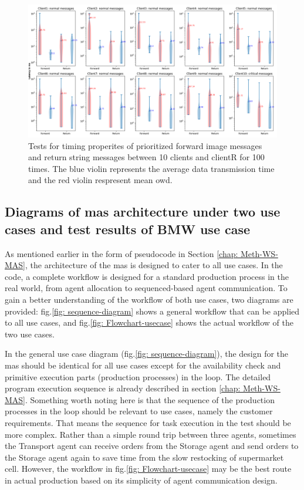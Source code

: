 \begin{figure}
    \centering
    \includegraphics[width=\textheight]{figures/tests/priority_tests/log_violin_10clients_image_priority.png}\hfill 
    \caption{Tests for timing properites of prioritized forward image messages and return string messages between 10 clients 
    and clientR for 100 times. The blue violin represents the average data transmission time and the red violin 
    respresent mean \gls{owd}.} \label{fig: priority-10clients-d}
\end{figure}


\subsection{Diagrams of \gls{mas} architecture under two use cases and 
test results of BMW use case}\label{chap: Result-Internal-Usecase}

As mentioned earlier in the form of pseudocode in Section \ref{chap: Meth-WS-MAS}, 
the architecture of the \gls{mas} is designed to cater to all use cases. In the code, 
a complete workflow is designed for a standard production process in the real world, 
from agent allocation to sequenced-based agent communication. To gain a better 
understanding of the workflow of both use cases, two diagrams are provided: 
fig.\ref{fig: sequence-diagram} shows a general workflow that can be applied to all
use cases, and fig.\ref{fig: Flowchart-usecase} shows the actual workflow of the 
two use cases.


In the general use case diagram (fig.\ref{fig: sequence-diagram}), the 
design for the \gls{mas} should be identical for all use cases except for 
the availability check and primitive execution parts (production processes) in the loop. 
The detailed program execution sequence is already described in 
section \ref{chap: Meth-WS-MAS}. Something worth noting here is that the sequence 
of the production processes in the loop should be relevant to use cases, namely the 
customer requirements. That means the sequence for task execution in the test should 
be more complex. Rather than a simple round trip between three agents, sometimes the 
Transport agent can receive orders from the Storage agent and send orders to the Storage 
agent again to save time from the slow restocking of supermarket cell. However, 
the workflow in fig.\ref{fig: Flowchart-usecase} may be the best route in actual 
production based on its simplicity of agent communication design.  

